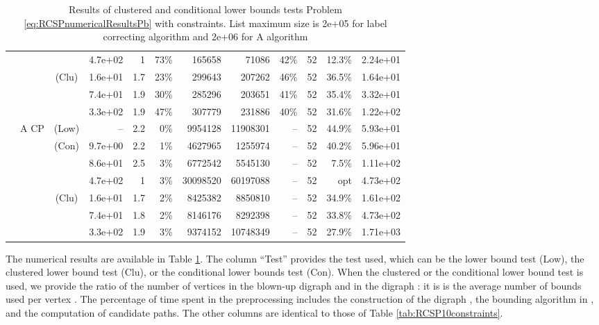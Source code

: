 \documentclass[11pt]{amsart}
\newenvironment{outdent}
{\begin{list}{}{\leftmargin-2cm\rightmargin\leftmargin}\centering\item\relax}
{\end{list}\ignorespacesafterend}
\theoremstyle{plain}
\theoremstyle{remark}
\begin{document}
\begin{table}
\begin{outdent}
\begin{small}
\begin{tabular}{|l|ccr|rr|rrr|rr|r|}
& &  & 4.7e+02 & 1 & 73\% & 165658 & 71086 & 42\% &52 & 12.3\% & 2.24e+01 \\
& & (Clu) & 1.6e+01 & 1.7 & 23\% & 299643 & 207262 & 46\% &52 & 36.5\% & 1.64e+01 \\
& &  & 7.4e+01 & 1.9 & 30\% & 285296 & 203651 & 41\% &52 & 35.4\% & 3.32e+01 \\
& &  & 3.3e+02 & 1.9 & 47\% & 307779 & 231886 & 40\% &52 & 31.6\% & 1.22e+02 \\
&A CP & (Low) & --  &2.2 & 0\% & 9954128 & 11908301 & -- &52 & 44.9\% & 5.93e+01 \\
& & (Con) & 9.7e+00 & 2.2 & 1\% & 4627965 & 1255974 & -- &52 & 40.2\% & 5.96e+01 \\
& &  & 8.6e+01 & 2.5 & 3\% & 6772542 & 5545130 & -- &52 & 7.5\% & 1.11e+02 \\
& &  & 4.7e+02 & 1 & 3\% & 30098520 & 60197088 & -- &52 & opt & 4.73e+02 \\
& & (Clu) & 1.6e+01 & 1.7 & 2\% & 8425382 & 8850810 & -- &52 & 34.9\% & 1.61e+02 \\
& &  & 7.4e+01 & 1.8 & 2\% & 8146176 & 8292398 & -- &52 & 33.8\% & 4.73e+02 \\
& &  & 3.3e+02 & 1.9 & 3\% & 9374152 & 10748349 & -- &52 & 27.9\% & 1.71e+03 \\
\hline
\end{tabular}
\end{small}
\end{outdent}
\caption{Results of clustered and conditional lower bounds tests Problem \eqref{eq:RCSPnumericalResultsPb} with  constraints. List  maximum size is 2e+05 for label correcting algorithm and 2e+06 for A algorithm}\label{tab:clusCondRes}
\end{table}

The numerical results are available in Table \ref{tab:clusCondRes}. The column ``Test'' provides the test used, which can be the lower bound test (Low), the clustered lower bound test (Clu), or the conditional lower bounds test (Con). When the clustered or the conditional lower bound test is used, we provide the ratio  of the number of vertices in the blown-up digraph  and in the digraph : it is is the average number of bounds used per vertex . The percentage of time spent in the preprocessing includes the construction of the digraph , the bounding algorithm in , and the computation of candidate paths. The other columns are identical to those of Table \ref{tab:RCSP10constraints}. 
\end{document}
